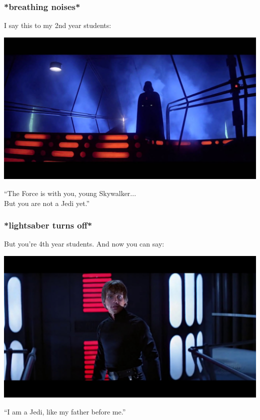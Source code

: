 \begin{frame}
\frametitle{*breathing noises*}

I say this to my 2nd year students:

\begin{center}
	\includegraphics[width=\textwidth]{images/vader.jpg}
\end{center}

``The Force is with you, young Skywalker...\\
\quad But you are not a Jedi yet.''


\end{frame}


\begin{frame}
\frametitle{*lightsaber turns off*}

But you're 4th year students. And now you can say:
\begin{center}
	\includegraphics[width=\textwidth]{images/skywalker.jpg}
\end{center}

``I am a Jedi, like my father before me.''

\end{frame}


